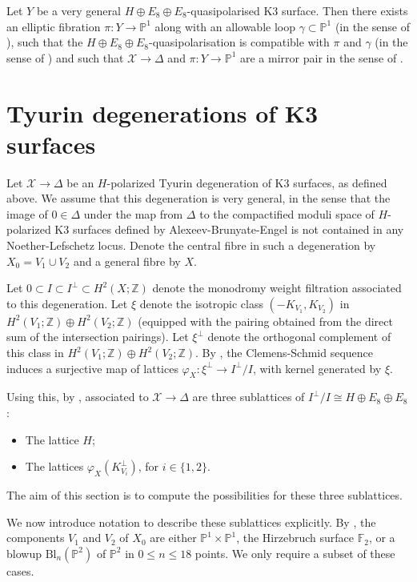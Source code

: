 \documentclass[a4paper]{amsart}
\theoremstyle{definition}
\theoremstyle{plain}
\theoremstyle{remark}
\newcommand{\bF}{\mathbb{F}}
\newcommand{\bP}{\mathbb{P}}
\newcommand{\bZ}{\mathbb{Z}}
\newcommand{\calX}{\mathcal{X}}
\numberwithin{figure}{section}
\numberwithin{table}{section}
\begin{document}
Let $Y$ be a very general $H \oplus E_8 \oplus E_8$-quasipolarised K3 surface. Then there exists an elliptic fibration $\pi \colon Y \to \mathbb{P}^1$ along with an allowable loop $\gamma \subset \mathbb{P}^1$ (in the sense of \cite[Definition 4.11]{dfk3slpms}), such that the $H \oplus E_8 \oplus E_8$-quasipolarisation is compatible with $\pi$ and $\gamma$ (in the sense of \cite[Definition 4.21]{dfk3slpms}) and such that $\mathcal{X} \to \Delta$ and $\pi \colon Y \to \mathbb{P}^1$ are a mirror pair in the sense of \cite[Definition 5.1]{dfk3slpms}.

\section{Tyurin degenerations of K3 surfaces}\label{sec:tyurin}

Let $\calX \to \Delta$ be an $H$-polarized Tyurin degeneration of K3 surfaces, as defined above. We assume that this degeneration is very general, in the sense that the image of $0 \in \Delta$ under the map from $\Delta$ to the compactified moduli space of $H$-polarized K3 surfaces defined by Alexeev-Brunyate-Engel \cite{cmek3sspt} is not contained in any Noether-Lefschetz locus. Denote the central fibre in such a degeneration by $X_0 = V_1 \cup V_2$ and a general fibre by $X$.

Let $0 \subset I \subset I^{\perp} \subset H^2(X;\bZ)$ denote the monodromy weight filtration associated to this degeneration. Let $\xi$ denote the isotropic class $(-K_{V_1},K_{V_2})$ in $H^2(V_1;\bZ) \oplus H^2(V_2;\bZ)$ (equipped with the pairing obtained from the direct sum of the intersection pairings). Let $\xi^{\perp}$ denote the orthogonal complement of this class in $H^2(V_1;\bZ) \oplus H^2(V_2;\bZ)$. By \cite[Lemma 3.5]{npgttk3s}, the Clemens-Schmid sequence induces a surjective map of lattices $\varphi_X\colon \xi^{\perp} \to I^{\perp}/I$, with kernel generated by $\xi$.

Using this, by \cite[Section 5.1]{dfk3slpms}, associated to $\calX \to \Delta$ are three sublattices of $I^{\perp}/I \cong H \oplus E_8 \oplus E_8$:
\begin{itemize}
\item The lattice $H$;
\item The lattices $\varphi_X(K_{V_i}^{\perp})$, for $i \in \{1,2\}$.
\end{itemize}
The aim of this section is to compute the possibilities for these three sublattices.

We now introduce notation to describe these sublattices explicitly. By \cite[Lemma 1.14]{tiidk3s}, the components $V_1$ and $V_2$ of $X_0$ are either $\bP^1 \times \bP^1$, the Hirzebruch surface $\bF_2$, or a blowup $\mathrm{Bl}_n(\bP^2)$ of $\bP^2$ in $0 \leq n \leq 18$ points. We only require a subset of these cases.
\end{document}
